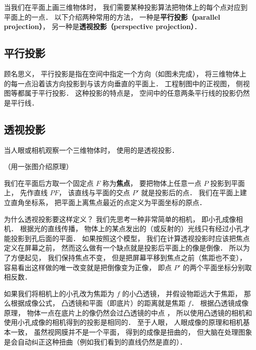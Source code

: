 

当我们在平面上画三维物体时， 我们需要某种投影算法把物体上的每个点对应到平面上的一点． 以下介绍两种常用的方法， 一种是\textbf{平行投影（parallel projection）}， 另一种是\textbf{透视投影（perspective projection）}．


\subsection{平行投影}
顾名思义， 平行投影是指在空间中指定一个方向（如图未完成）， 将三维物体上的每一点沿着该方向投影到与该方向垂直的平面上． 工程制图中的正视图， 侧视图等都属于平行投影． 这种投影的特点是， 空间中的任意两条平行线的投影仍然是平行线．

\subsection{透视投影}
当人眼或相机观察一个三维物体时， 使用的是透视投影．

（用一张图介绍原理）

我们在平面后方取一个固定点 $F$ 称为\textbf{焦点}， 要把物体上任意一点 $P$ 投影到平面上， 先作直线 $PF$， 该直线与平面的交点 $P'$ 就是投影后的点． 我们在平面上建立直角坐标系， 把平面上离焦点最近的点定义为平面坐标的原点．

为什么透视投影要这样定义？ 我们先思考一种非常简单的相机， 即小孔成像相机． 根据光的直线传播， 物体上的某点发出的（或反射的）光线只有经过小孔才能投影到孔后面的平面． 如果按照这个模型， 我们在计算透视投影时应该把焦点定义在屏幕之前， 然而这么做有一个缺点就是投影后平面上的像是倒像． 所以为了方便起见， 我们保持焦点不变， 但是把屏幕平移到焦点之前（焦距也不变）， 容易看出这样做的唯一改变就是把倒像变为正像， 即点 $P'$ 的两个平面坐标分别取相反数． %

如果我们将相机上的小孔改为焦距为 $f$ 的小凸透镜， 并假设物距远大于焦距， 那么根据成像公式， 凸透镜和平面（即底片）的距离就是焦距 $f$． 根据凸透镜成像原理， 物体一点在底片上的像仍然会过凸透镜的中点%
， 所以使用凸透镜的相机和使用小孔成像的相机得到的投影是相同的． 至于人眼， 人眼成像的原理和相机基本一致， 虽然视网膜并不是一个平面， 得到的成像是扭曲的， 但大脑在处理图象是会自动纠正这种扭曲（例如我们看到的直线仍然是直的）．

